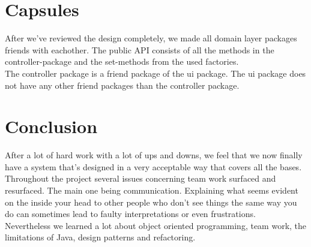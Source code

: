 \documentclass[12pt]{article}
\begin{document}
\section{Capsules}
After we've reviewed the design completely, we made all domain layer packages friends with eachother. The public API consists of all the methods in the controller-package and the set-methods from the used factories.\\
The controller package is a friend package of the ui package. The ui package does not have any other friend packages than the controller package.

\section{Conclusion}
After a lot of hard work with a lot of ups and downs, we feel that we now finally have a system that's designed in a very acceptable way that covers all the bases. Throughout the project several issues concerning team work surfaced and resurfaced. The main one being communication. Explaining what seems evident on the inside your head to other people who don't see things the same way you do can sometimes lead to faulty interpretations or even frustrations.\\
Nevertheless we learned a lot about object oriented programming, team work, the limitations of Java, design patterns and refactoring.
\end{document}
